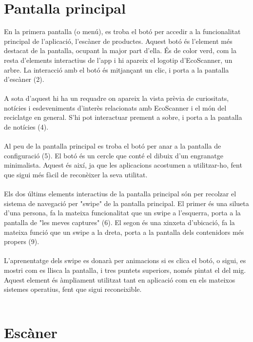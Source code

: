 \documentclass{article}
\begin{document}
\section{Pantalla principal}
En la primera pantalla (o menú), es troba el botó per accedir a la
funcionalitat principal de l'aplicació, l'escàner de productes. Aquest
botó és l'element més destacat de la pantalla, ocupant la major part
d'ella. És de color verd, com la resta d'elements interactius de l'app
i hi apareix el logotip d'EcoScanner, un arbre. La interacció amb el botó
és mitjançant un clic, i porta a la pantalla d'escàner (2).\\
\\
A sota d'aquest hi ha un requadre on apareix la
vista prèvia de curiositats, notícies i esdeveniments d'interès relacionats
amb EcoScanner i el món del reciclatge en general. S'hi pot interactuar
prement a sobre, i porta a la pantalla de notícies (4).\\
\\
Al peu de la pantalla principal es troba el botó per
anar a la pantalla de configuració (5). El botó és un cercle que conté
el dibuix d'un engranatge minimalista. Aquest és així, ja que
les aplicacions acostumen a utilitzar-ho, fent que sigui més
fàcil de reconèixer la seva utilitat.\\
\\
Els dos últims elements interactius de la pantalla principal són per
recolzar el sistema de navegació per "swipe" de la pantalla principal. El
primer és una silueta d'una persona, fa la mateixa funcionalitat que un swipe
a l'esquerra, porta a la pantalla de "les meves captures" (6). El segon és
una xinxeta d'ubicació, fa la mateixa funció que un swipe a la dreta, porta a
la pantalla dels contenidors més propers (9).\\
\\
L'aprenentatge dels swipe es donarà per animacions si es clica el botó,
o sigui, es mostri com es llisca la pantalla, i tres puntets superiors,
només pintat el del mig. Aquest element és àmpliament utilitzat tant en
aplicació com en els mateixos sistemes operatius, fent que sigui reconeixible.
\\\\

\section{Escàner}
\end{document}
